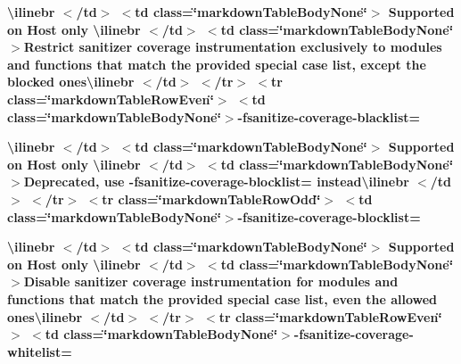 \begin{longtabu}
{\bfseries{{\ttfamily \textbackslash{}ilinebr \texorpdfstring{$<$}{<}/td\texorpdfstring{$>$}{>} \texorpdfstring{$<$}{<}td class=\char`\"{}markdown\+Table\+Body\+None\char`\"{}\texorpdfstring{$>$}{>} Supported on Host only \textbackslash{}ilinebr \texorpdfstring{$<$}{<}/td\texorpdfstring{$>$}{>} \texorpdfstring{$<$}{<}td class=\char`\"{}markdown\+Table\+Body\+None\char`\"{}\texorpdfstring{$>$}{>}}Restrict sanitizer coverage instrumentation exclusively to modules and functions that match the provided special case list, except the blocked ones{\ttfamily \textbackslash{}ilinebr \texorpdfstring{$<$}{<}/td\texorpdfstring{$>$}{>} \texorpdfstring{$<$}{<}/tr\texorpdfstring{$>$}{>} \texorpdfstring{$<$}{<}tr class=\char`\"{}markdown\+Table\+Row\+Even\char`\"{}\texorpdfstring{$>$}{>} \texorpdfstring{$<$}{<}td class=\char`\"{}markdown\+Table\+Body\+None\char`\"{}\texorpdfstring{$>$}{>}}-\/fsanitize-\/coverage-\/blacklist=}}

{\bfseries{{\ttfamily \textbackslash{}ilinebr \texorpdfstring{$<$}{<}/td\texorpdfstring{$>$}{>} \texorpdfstring{$<$}{<}td class=\char`\"{}markdown\+Table\+Body\+None\char`\"{}\texorpdfstring{$>$}{>} Supported on Host only \textbackslash{}ilinebr \texorpdfstring{$<$}{<}/td\texorpdfstring{$>$}{>} \texorpdfstring{$<$}{<}td class=\char`\"{}markdown\+Table\+Body\+None\char`\"{}\texorpdfstring{$>$}{>}}Deprecated, use -\/fsanitize-\/coverage-\/blocklist= instead{\ttfamily \textbackslash{}ilinebr \texorpdfstring{$<$}{<}/td\texorpdfstring{$>$}{>} \texorpdfstring{$<$}{<}/tr\texorpdfstring{$>$}{>} \texorpdfstring{$<$}{<}tr class=\char`\"{}markdown\+Table\+Row\+Odd\char`\"{}\texorpdfstring{$>$}{>} \texorpdfstring{$<$}{<}td class=\char`\"{}markdown\+Table\+Body\+None\char`\"{}\texorpdfstring{$>$}{>}}-\/fsanitize-\/coverage-\/blocklist=}}

{\bfseries{{\ttfamily \textbackslash{}ilinebr \texorpdfstring{$<$}{<}/td\texorpdfstring{$>$}{>} \texorpdfstring{$<$}{<}td class=\char`\"{}markdown\+Table\+Body\+None\char`\"{}\texorpdfstring{$>$}{>} Supported on Host only \textbackslash{}ilinebr \texorpdfstring{$<$}{<}/td\texorpdfstring{$>$}{>} \texorpdfstring{$<$}{<}td class=\char`\"{}markdown\+Table\+Body\+None\char`\"{}\texorpdfstring{$>$}{>}}Disable sanitizer coverage instrumentation for modules and functions that match the provided special case list, even the allowed ones{\ttfamily \textbackslash{}ilinebr \texorpdfstring{$<$}{<}/td\texorpdfstring{$>$}{>} \texorpdfstring{$<$}{<}/tr\texorpdfstring{$>$}{>} \texorpdfstring{$<$}{<}tr class=\char`\"{}markdown\+Table\+Row\+Even\char`\"{}\texorpdfstring{$>$}{>} \texorpdfstring{$<$}{<}td class=\char`\"{}markdown\+Table\+Body\+None\char`\"{}\texorpdfstring{$>$}{>}}-\/fsanitize-\/coverage-\/whitelist=}}


\end{longtabu}
